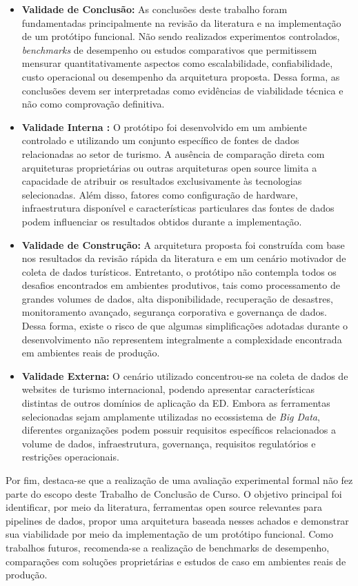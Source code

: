 \begin{itemize}

\item \textbf{Validade de Conclusão:}  As conclusões deste trabalho foram fundamentadas principalmente na revisão da literatura e na implementação de um protótipo funcional. Não sendo realizados experimentos controlados, \textit{benchmarks} de desempenho ou estudos comparativos que permitissem mensurar quantitativamente aspectos como escalabilidade, confiabilidade, custo operacional ou desempenho da arquitetura proposta. Dessa forma, as conclusões devem ser interpretadas como evidências de viabilidade técnica e não como comprovação definitiva.


\item \textbf{Validade Interna :} O protótipo foi desenvolvido em um ambiente controlado e utilizando um conjunto específico de fontes de dados relacionadas ao setor de turismo. A ausência de comparação direta com arquiteturas proprietárias ou outras arquiteturas open source limita a capacidade de atribuir os resultados exclusivamente às tecnologias selecionadas. Além disso, fatores como configuração de hardware, infraestrutura disponível e características particulares das fontes de dados podem influenciar os resultados obtidos durante a implementação.

\item \textbf{Validade de Construção:} A arquitetura proposta foi construída com base nos resultados da revisão rápida da literatura e em um cenário motivador de coleta de dados turísticos. Entretanto, o protótipo não contempla todos os desafios encontrados em ambientes produtivos, tais como processamento de grandes volumes de dados, alta disponibilidade, recuperação de desastres, monitoramento avançado, segurança corporativa e governança de dados. Dessa forma, existe o risco de que algumas simplificações adotadas durante o desenvolvimento não representem integralmente a complexidade encontrada em ambientes reais de produção.

\item \textbf{Validade Externa:}   O cenário utilizado concentrou-se na coleta de dados de websites de turismo internacional, podendo apresentar características distintas de outros domínios de aplicação da ED.
Embora as ferramentas selecionadas sejam amplamente utilizadas no ecossistema de \textit{Big Data}, diferentes organizações podem possuir requisitos específicos relacionados a volume de dados, infraestrutura, governança, requisitos regulatórios e restrições operacionais.
\end{itemize}

Por fim, destaca-se que a realização de uma avaliação experimental formal não fez parte do escopo deste Trabalho de Conclusão de Curso. O objetivo principal foi identificar, por meio da literatura, ferramentas open source relevantes para pipelines de dados, propor uma arquitetura baseada nesses achados e demonstrar sua viabilidade por meio da implementação de um protótipo funcional. Como trabalhos futuros, recomenda-se a realização de benchmarks de desempenho, comparações com soluções proprietárias e estudos de caso em ambientes reais de produção.
